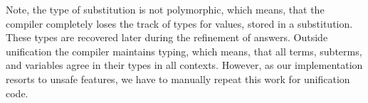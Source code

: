 \begin{comment}
Type annotations, included in the snippet above, can be justified by the following 
reasonings\footnote{We omit verbal description of unification algorithm; 
the details can be found in~\cite{MicroKanren}.}:

\begin{enumerate}
\item Line 2: the type of \mbox{$(s\;\;x^\tau)$} is $\tau$ due to invariant 2; hence, 
the type of \lstinline{walk} result coincides with the type of its second argument (technically,
an induction on the number of recursive invocations of \lstinline{walk} is needed).

\item Line 9: the substitution is left unchanged, hence all invariants are preserved.

\item Line 10 (and, symmetrically, line 11): first, note, that \mbox{$(s\;\;x_1)$} is undefined
(otherwise \lstinline{walk} would not return $x_1$). Then, $x_1$ and $t_2^\prime$ have the
same type, which justifies the preservation of invariant 2. Finally, either \mbox{$x_1=t_1$}
(and, then, $\tau$ is the type of $x_1$, assigned by the compiler), or $x_1$ is retrieved
from $s$ with type $\tau$~--- both cases justify invariants 1 and 3. The same applies to 
the pair $t_2^\prime$ and $t_2$.

\item The previous paragraph justifies the base case for inductive proof on the number of
recursive invocations of \lstinline{unify}.
\end{enumerate}
\end{comment}

Note, the type of substitution is not polymorphic, which means, 
that the compiler completely loses the track of types for values, stored in a substitution. These types are recovered later 
during the refinement of answers.
Outside unification the compiler maintains typing, which means, that all terms, subterms, and variables agree in their types 
in all contexts. However, as our implementation resorts to unsafe features, we have to manually repeat this work for 
unification code.



